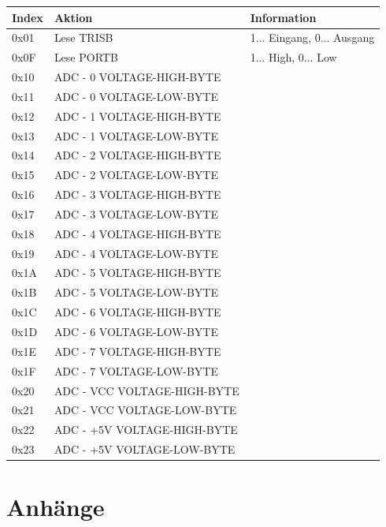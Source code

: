 \documentclass[a4paper,10pt]{article}
\begin{document}
\begin{center}
    \begin{tabular}{| l | l | l |}
    \hline
    \textbf{Index}	& \textbf{Aktion} 		& \textbf{Information} \\ \hline
    0x01 		& Lese TRISB 			& 1... Eingang, 0... Ausgang \\ \hline
    0x0F 		& Lese PORTB 			& 1... High, 0... Low \\ \hline
    0x10 		& ADC - 0 VOLTAGE-HIGH-BYTE 	& \\ \hline
    0x11 		& ADC - 0 VOLTAGE-LOW-BYTE 	& \\ \hline
    0x12 		& ADC - 1 VOLTAGE-HIGH-BYTE 	& \\ \hline
    0x13 		& ADC - 1 VOLTAGE-LOW-BYTE 	& \\ \hline
    0x14 		& ADC - 2 VOLTAGE-HIGH-BYTE 	& \\ \hline
    0x15 		& ADC - 2 VOLTAGE-LOW-BYTE 	& \\ \hline
    0x16 		& ADC - 3 VOLTAGE-HIGH-BYTE 	& \\ \hline
    0x17 		& ADC - 3 VOLTAGE-LOW-BYTE 	& \\ \hline
    0x18 		& ADC - 4 VOLTAGE-HIGH-BYTE 	& \\ \hline
    0x19 		& ADC - 4 VOLTAGE-LOW-BYTE 	& \\ \hline
    0x1A 		& ADC - 5 VOLTAGE-HIGH-BYTE 	& \\ \hline
    0x1B 		& ADC - 5 VOLTAGE-LOW-BYTE 	& \\ \hline
    0x1C 		& ADC - 6 VOLTAGE-HIGH-BYTE 	& \\ \hline
    0x1D 		& ADC - 6 VOLTAGE-LOW-BYTE 	& \\ \hline
    0x1E 		& ADC - 7 VOLTAGE-HIGH-BYTE 	& \\ \hline
    0x1F 		& ADC - 7 VOLTAGE-LOW-BYTE 	& \\ \hline
    0x20 		& ADC - VCC VOLTAGE-HIGH-BYTE 	& \\ \hline
    0x21 		& ADC - VCC VOLTAGE-LOW-BYTE 	& \\ \hline
    0x22 		& ADC - +5V VOLTAGE-HIGH-BYTE 	& \\ \hline
    0x23 		& ADC - +5V VOLTAGE-LOW-BYTE 	& \\ \hline
    \end{tabular}
\end{center}

\newpage
\section{Anhänge}
\end{document}
